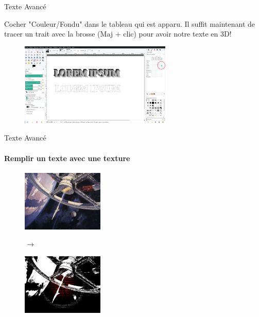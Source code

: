 \documentclass[10pt,svgnames,usenames,table]{beamer}
\begin{document}
\begin{frame}{Texte Avancé}
\begin{enumerate}
{			Cocher "Couleur/Fondu" dans le tableau qui est apparu. Il suffit maintenant de tracer un trait avec la brosse (Maj + clic) pour avoir notre texte en 3D!			
			\begin{figure}
			\centering
			\includegraphics[height=150px]{Images/text/3D4}
			\end{figure}
		}		
		\end{enumerate}
\end{frame}


\begin{frame}{Texte Avancé}
	\framesubtitle{Remplir un texte avec une texture}
		\begin{figure}[H]
			\centering
			\begin{minipage}{.5\textwidth}
				\centering
				\includegraphics[height=110px]{Images/text/2001_original} 
				\end{minipage}$\rightarrow$%
			\begin{minipage}{.5\textwidth}
				\centering
				\includegraphics[height=110px]{Images/text/2001_final} 
				\end{minipage}
			\end{figure}	
\end{frame}
\end{document}
